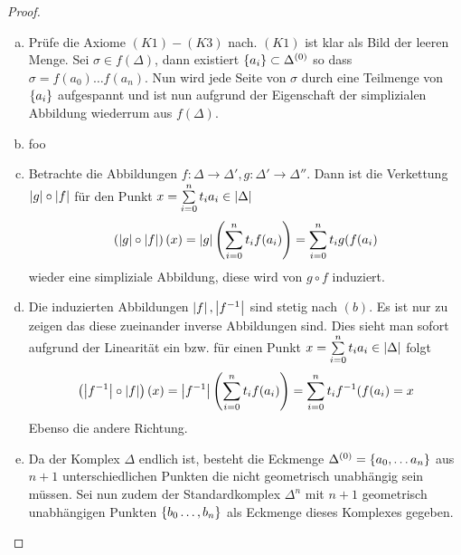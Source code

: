 \begin{Satz}
\begin{enumerate}[(a)]
	\end{enumerate}
	\begin{proof}
          \begin{enumerate}[(a)]
          \item Prüfe die Axiome $(K1)-(K3)$ nach. $(K1)$ ist klar als
            Bild der leeren Menge. Sei $\sigma \in f(\Delta)$, dann
            existiert $\left\{ a_i \right\} \subset \Delta^{(0)}$ so dass
            $\sigma = f(a_0)\ldots f(a_n)$. Nun wird jede Seite von
            $\sigma$ durch eine Teilmenge von $\left\{ a_i \right\}$ aufgespannt
            und ist nun aufgrund der Eigenschaft der simplizialen
            Abbildung wiederrum aus $f(\Delta)$. 

          \item foo
          \item Betrachte die Abbildungen
            $f : \Delta \rightarrow \Delta' , g : \Delta' \rightarrow
            \Delta''$.
            Dann ist die Verkettung $\left| g \right| \circ \left| f \right|$ für den Punkt
            $x = \sum\limits_{i=0}^{n} t_i a_i \in \left| \Delta \right|$
            \begin{gather*}
              \left( \left| g \right| \circ \left| f \right| \right) (x) = \left| g \right| \left(
                \sum\limits_{i=0}^{n} t_i f(a_i) \right) = \sum\limits_{i=0}^{n} t_i g(f(a_i)
            \end{gather*}
            wieder eine simpliziale Abbildung, diese wird von
            $g \circ f$ induziert.
          \item Die induzierten Abbildungen $\left| f \right|,\left| f^{-1} \right|$ sind
            stetig nach $(b)$. Es ist nur zu zeigen das diese
            zueinander inverse Abbildungen sind. Dies sieht man sofort
            aufgrund der Linearität ein bzw. für einen Punkt
            $x = \sum\limits_{i=0}^{n} t_i a_i \in \left| \Delta \right|$ folgt
            \begin{gather*}
              \left( \left| f^{-1} \right| \circ \left| f \right| \right) (x) =
              \left| f^{-1} \right| \left( \sum\limits_{i=0}^{n} t_i f(a_i) \right) =
              \sum\limits_{i=0}^{n} t_i f^{-1}(f(a_i) = x
            \end{gather*}
            Ebenso die andere Richtung.
          \item Da der Komplex $\Delta$ endlich ist, besteht die
            Eckmenge $\Delta^{(0)} = \left\{  a_0 , \ldots a_n \right\}$ aus
            $n+1$ unterschiedlichen Punkten die nicht geometrisch
            unabhängig sein müssen. Sei nun zudem der Standardkomplex
            $\Delta^n$ mit $n+1$ geometrisch unabhängigen Punkten
            $\left\{ b_0 \ldots , b_n \right\}$ als Eckmenge dieses Komplexes
            gegeben.


\end{enumerate}
\end{proof}
\end{Satz}
